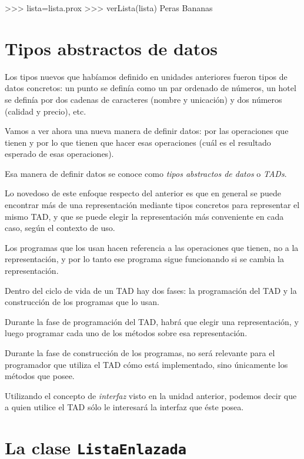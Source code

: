 \begin{codigo-python-sn}
>>> lista=lista.prox
>>> verLista(lista)
Peras
Bananas
\end{codigo-python-sn}

\section{Tipos abstractos de datos}

Los tipos nuevos que habíamos definido en unidades anteriores fueron tipos de
datos concretos: un punto se definía como un par ordenado de números, un hotel
se definía por dos cadenas de caracteres (nombre y unicación) y dos números
(calidad y precio), etc.

Vamos a ver ahora una nueva manera de definir datos: por las
operaciones que tienen y por lo que tienen que hacer esas
operaciones (cuál es el resultado esperado de esas operaciones).

Esa manera de definir datos se conoce como {\it tipos abstractos de datos} o
{\it TADs}.

Lo novedoso de este enfoque respecto del anterior es que en general se puede
encontrar más de una representación mediante tipos concretos para representar
el mismo TAD, y que se puede elegir la representación más conveniente en cada
caso, según el contexto de uso.

Los programas que los usan hacen referencia a las operaciones que tienen, no a
la representación, y por lo tanto ese programa sigue funcionando si se cambia
la representación.

Dentro del ciclo de vida de un TAD hay dos fases: la programación del TAD y
la construcción de los programas que lo usan.

Durante la fase de programación del TAD, habrá que elegir una
representación, y luego programar cada uno de los métodos sobre esa
representación.

Durante la fase de construcción de los programas, no será relevante para el
programador que utiliza el TAD cómo está implementado, sino únicamente los
métodos que posee.

\begin{observacion}
Utilizando el concepto de \emph{interfaz} visto en la unidad anterior, podemos
decir que a quien utilice el TAD sólo le interesará la interfaz que éste
posea.
\end{observacion}

\section{La clase {\tt ListaEnlazada}}

